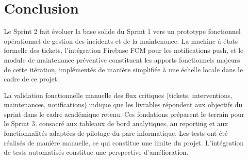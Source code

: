 \section*{Conclusion}
\label{sec:conclusion_sprint2}

Le Sprint 2 fait évoluer la base solide du Sprint 1 vers un prototype fonctionnel opérationnel de gestion des incidents et de la maintenance. La machine à états formelle des tickets, l'intégration Firebase FCM pour les notifications push, et le module de maintenance préventive constituent les apports fonctionnels majeurs de cette itération, implémentés de manière simplifiée à une échelle locale dans le cadre de ce projet.

La validation fonctionnelle manuelle des flux critiques (tickets, interventions, maintenances, notifications) indique que les livrables répondent aux objectifs du sprint dans le cadre académique retenu. Ces fondations préparent le terrain pour le Sprint 3, consacré aux tableaux de bord analytiques, au reporting et aux fonctionnalités adaptées de pilotage du parc informatique. Les tests ont été réalisés de manière manuelle, ce qui constitue une limite du projet. L’intégration de tests automatisés constitue une perspective d’amélioration.



